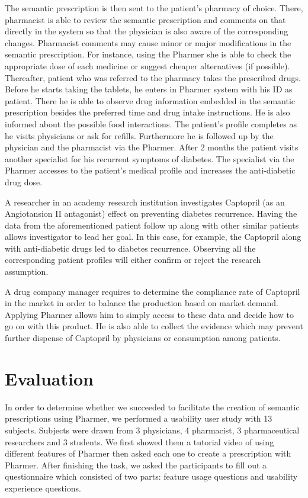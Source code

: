 \documentclass[10pt, conference, compsocconf]{IEEEtran}
\begin{document}
The semantic prescription is then sent to the patient's pharmacy of choice.
There, pharmacist is able to review the semantic prescription and comments on that directly in the system so that the physician is also aware of the corresponding changes.
Pharmacist comments may cause minor or major modifications in the semantic prescription.
For instance, using the Pharmer she is able to check the appropriate dose of each medicine or suggest cheaper alternatives (if possible).
Thereafter, patient who was referred to the pharmacy takes the prescribed drugs.
Before he starts taking the tablets, he enters in Pharmer system with his ID as patient.
There he is able to observe drug information embedded in the semantic prescription besides the preferred time and drug intake instructions.
He is also informed about the possible food interactions.
The patient's profile completes as he visits physicians or ask for refills.
Furthermore he is followed up by the physician and the pharmacist via the Pharmer.
After 2 months the patient visits another specialist for his recurrent symptoms of diabetes.
The specialist via the Pharmer accesses to the patient's medical profile and increases the anti-diabetic drug dose.

A researcher in an academy research institution investigates Captopril (as an Angiotansion II antagonist) effect on preventing diabetes recurrence.
Having the data from the aforementioned patient follow up along with other similar patients allows investigator to lead her goal.
In this case, for example, the Captopril along with anti-diabetic drugs led to diabetes recurrence.
Observing all the corresponding patient profiles will either confirm or reject the research assumption.

 A drug company manager requires to determine the compliance rate of Captopril in the market in order to balance the production based on market demand.
 Applying Pharmer allows him to simply access to these data and decide how to go on with this product.
 He is also able to collect the evidence which may prevent further dispense of Captopril by physicians or consumption among patients.


\section{Evaluation}
\label{sec:evaluation}
In order to determine whether we succeeded to facilitate the creation of semantic prescriptions using Pharmer, we performed a usability user study with 13 subjects.
Subjects were drawn from 3 physicians, 4 pharmacist, 3 pharmaceutical researchers and 3 students.
We first showed them a tutorial video of using different features of Pharmer then asked each one to create a prescription with Pharmer.
After finishing the task, we asked the participants to fill out a questionnaire which consisted of two parts: feature usage questions and usability experience questions.
\end{document}

